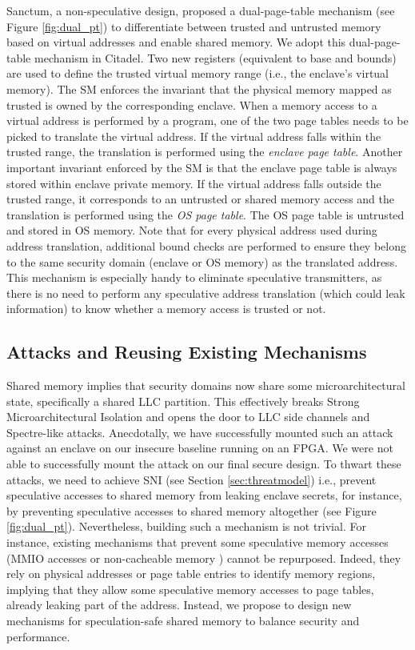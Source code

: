 Sanctum, a non-speculative design, proposed a dual-page-table mechanism (see Figure \ref{fig:dual_pt}) to differentiate between trusted and untrusted memory based on virtual addresses and enable shared memory.
We adopt this dual-page-table mechanism in Citadel. 
Two new registers (equivalent to base and bounds) are used to define the trusted virtual memory range (i.e., the enclave's virtual memory).
The SM enforces the invariant that the physical memory mapped as trusted is owned by the corresponding enclave.
When a memory access to a virtual address is performed by a program, one of the two page tables needs to be picked to translate the virtual address.
If the virtual address falls within the trusted range, the translation is performed using the \emph{enclave page table}.
Another important invariant enforced by the SM is that the enclave page table is always stored within enclave private memory.
If the virtual address falls outside the trusted range, it corresponds to an untrusted or shared memory access and the translation is performed using the \emph{OS page table}.
The OS page table is untrusted and stored in OS memory.
Note that for every physical address used during address translation, additional bound checks are performed to ensure they belong to the same security domain (enclave or OS memory) as the translated address.
This mechanism is especially handy to eliminate speculative transmitters,
as there is no need to perform any speculative address translation (which could leak information) to know whether a memory access is trusted or not.

\subsection{Attacks and Reusing Existing Mechanisms}
\label{sec:attackandexisting}

Shared memory implies that security domains now share some microarchitectural state, specifically a shared LLC partition.
This effectively breaks Strong Microarchitectural Isolation and opens the door to LLC side channels and Spectre-like attacks.
Anecdotally, we have successfully mounted such an attack against an enclave on our insecure baseline running on an FPGA.
We were not able to successfully mount the attack on our final secure design.
To thwart these attacks, we need to achieve SNI
(see Section \ref{sec:threatmodel}) i.e., prevent speculative accesses to shared memory from leaking enclave secrets, for instance, by preventing speculative accesses to shared memory altogether (see Figure \ref{fig:dual_pt}).
Nevertheless, building such a mechanism is not trivial.
For instance, existing mechanisms that prevent some speculative memory accesses (MMIO accesses or non-cacheable memory \cite{schwarz2020context}) cannot be repurposed.
Indeed, they rely on physical addresses or page table entries to identify memory regions, implying that they allow some speculative memory accesses to page tables, already leaking part of the address.
Instead, we propose to design new mechanisms for speculation-safe shared memory to balance security and performance.

